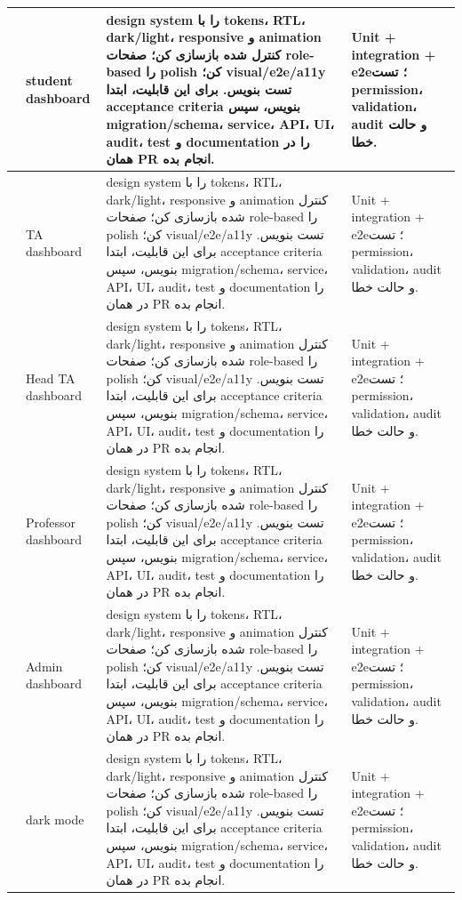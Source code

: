 \documentclass[11pt,a4paper]{article}
\begin{document}
\begin{longtable}{|>{\raggedleft\arraybackslash}p{}|>{\raggedleft\arraybackslash}p{}|>{\raggedleft\arraybackslash}p{}|>{\raggedleft\arraybackslash}p{}|}
266 & student dashboard & design system را با tokens، RTL، dark/light، responsive و animation کنترل شده بازسازی کن؛ صفحات role-based را polish کن؛ visual/e2e/a11y تست بنویس. برای این قابلیت، ابتدا acceptance criteria بنویس، سپس migration/schema، service، API، UI، audit، test و documentation را در همان PR انجام بده. & Unit + integration + e2e؛ تست permission، validation، audit و حالت خطا. \\ \hline
267 & TA dashboard & design system را با tokens، RTL، dark/light، responsive و animation کنترل شده بازسازی کن؛ صفحات role-based را polish کن؛ visual/e2e/a11y تست بنویس. برای این قابلیت، ابتدا acceptance criteria بنویس، سپس migration/schema، service، API، UI، audit، test و documentation را در همان PR انجام بده. & Unit + integration + e2e؛ تست permission، validation، audit و حالت خطا. \\ \hline
268 & Head TA dashboard & design system را با tokens، RTL، dark/light، responsive و animation کنترل شده بازسازی کن؛ صفحات role-based را polish کن؛ visual/e2e/a11y تست بنویس. برای این قابلیت، ابتدا acceptance criteria بنویس، سپس migration/schema، service، API، UI، audit، test و documentation را در همان PR انجام بده. & Unit + integration + e2e؛ تست permission، validation، audit و حالت خطا. \\ \hline
269 & Professor dashboard & design system را با tokens، RTL، dark/light، responsive و animation کنترل شده بازسازی کن؛ صفحات role-based را polish کن؛ visual/e2e/a11y تست بنویس. برای این قابلیت، ابتدا acceptance criteria بنویس، سپس migration/schema، service، API، UI، audit، test و documentation را در همان PR انجام بده. & Unit + integration + e2e؛ تست permission، validation، audit و حالت خطا. \\ \hline
270 & Admin dashboard & design system را با tokens، RTL، dark/light، responsive و animation کنترل شده بازسازی کن؛ صفحات role-based را polish کن؛ visual/e2e/a11y تست بنویس. برای این قابلیت، ابتدا acceptance criteria بنویس، سپس migration/schema، service، API، UI، audit، test و documentation را در همان PR انجام بده. & Unit + integration + e2e؛ تست permission، validation، audit و حالت خطا. \\ \hline
271 & dark mode & design system را با tokens، RTL، dark/light، responsive و animation کنترل شده بازسازی کن؛ صفحات role-based را polish کن؛ visual/e2e/a11y تست بنویس. برای این قابلیت، ابتدا acceptance criteria بنویس، سپس migration/schema، service، API، UI، audit، test و documentation را در همان PR انجام بده. & Unit + integration + e2e؛ تست permission، validation، audit و حالت خطا. \\ \hline

\end{longtable}
\end{document}

